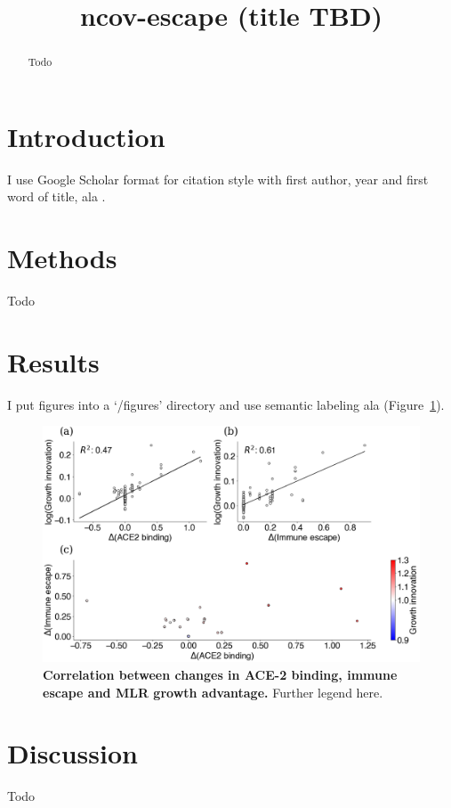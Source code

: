 \documentclass[11pt,oneside,letterpaper]{article}
\title{\vspace{1.0cm} \Large \bf
ncov-escape (title TBD)
}
\date{}
\begin{document}
\maketitle

\begin{abstract}

Todo

\end{abstract}

\section*{Introduction}

I use Google Scholar format for citation style with first author, year and first word of title, ala \cite{hadfield2018nextstrain}.

\section*{Methods}

Todo

\section*{Results}

I put figures into a `/figures' directory and use semantic labeling ala (Figure~\ref{binding-escape-score-growth-advantage-innovations}).

\begin{figure}[h]
	\centering
	\includegraphics[width=1.0\textwidth]{figures/binding-escape-score-growth-advantage-innovations}
	\caption{\textbf{Correlation between changes in ACE-2 binding, immune escape and MLR growth advantage.}
	Further legend here.
	}
	\label{binding-escape-score-growth-advantage-innovations}
\end{figure}

\section*{Discussion}

Todo



\end{document}
